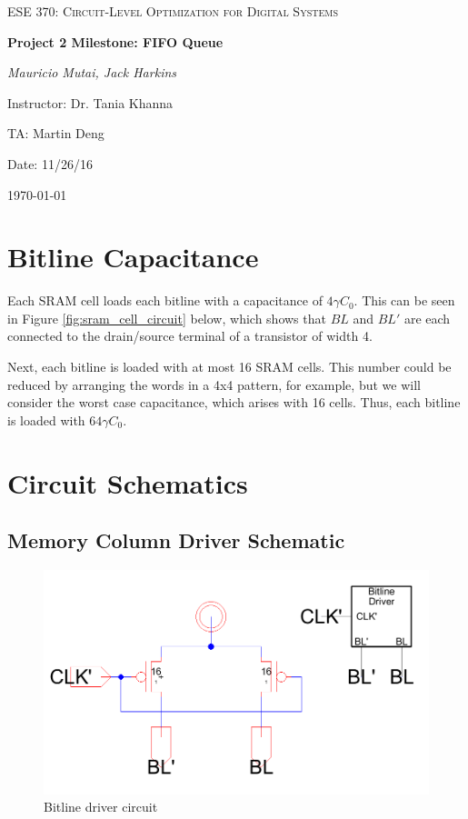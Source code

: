 \documentclass[12pt]{report}
\begin{document}
\begin{titlepage}
	\centering
	\vspace{1cm}
	{\scshape\Large ESE 370: Circuit-Level Optimization for Digital Systems\par}
	\vspace{1.5cm}
	{\huge\bfseries Project 2 Milestone: FIFO Queue\par}
	\vspace{2cm}
	{\Large\itshape Mauricio Mutai, Jack Harkins\par}
	\vfill
	Instructor: Dr. Tania Khanna\par
	TA: Martin Deng\par
	Date: 11/26/16

	\vfill

	{\large \today\par}
\end{titlepage}

\section*{Bitline Capacitance}
Each SRAM cell loads each bitline with a capacitance of $4\gamma C_0$. This can be seen in Figure \ref{fig:sram_cell_circuit} below, which shows that $BL$ and $BL'$ are each connected to the drain/source terminal of a transistor of width 4.

Next, each bitline is loaded with at most 16 SRAM cells. This number could be reduced by arranging the words in a 4x4 pattern, for example, but we will consider the worst case capacitance, which arises with 16 cells. Thus, each bitline is loaded with $64\gamma C_0$.

\section*{Circuit Schematics}
\subsection*{Memory Column Driver Schematic}
\begin{figure}[H]
  \centering
    \includegraphics[width=1.0\textwidth]{bitline_driver_circuit.PNG}
  \caption{Bitline driver circuit}
  \label{fig:bitline_driver_circuit}
\end{figure}
\end{document}
